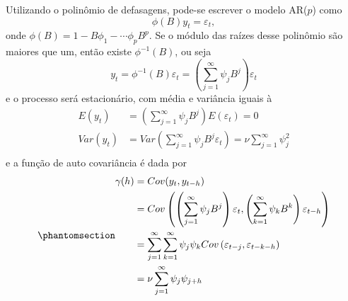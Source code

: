 \documentclass[
  letterpaper,
  DIV=11,
  numbers=noendperiod]{scrartcl}
\theoremstyle{definition}
\theoremstyle{definition}
\theoremstyle{plain}
\theoremstyle{plain}
\theoremstyle{remark}
\begin{document}
Utilizando o polinômio de defasagens, pode-se escrever o modelo
AR(\(p\)) como \begin{equation}
        \phi(B)y_t = \varepsilon_t,
\end{equation} onde \(\phi(B)=1-B\phi_1-\cdots \phi_p B^p\). Se o módulo
das raízes desse polinômio são maiores que um, então existe
\(\phi^{-1}(B)\), ou seja
\[y_t=\phi^{-1}(B)\varepsilon_t=\left(\sum_{j=1}^\infty \psi_jB^j\right)\varepsilon_t\]
e o processo será estacionário, com média e variância iguais à
\begin{align}E(y_t)&=\left(\sum_{j=1}^\infty \psi_jB^j\right)E(\varepsilon_t)=0\\
Var(y_t)&=Var\left(\sum_{j=1}^\infty \psi_jB^j\varepsilon_t\right)=\nu\sum_{j=1}^\infty \psi_j^2\\
\end{align} e a função de auto covariância é dada por
\begin{equation}\protect\phantomsection\label{eq-covariancia}{\begin{align}
\gamma(h)&=Cov(y_t,y_{t-h})\\&=Cov\left( \left(\sum_{j=1}^\infty \psi_jB^j\right)\varepsilon_t,\left(\sum_{k=1}^\infty \psi_kB^k\right)\varepsilon_{t-h}\right)\\
&=\sum_{j=1}^\infty \sum_{k=1}^\infty \psi_j\psi_k Cov\left(   \varepsilon_{t-j},\varepsilon_{t-k-h}\right)\\
&=\nu\sum_{j=1}^\infty \psi_j\psi_{j+h}\end{align}}\end{equation}
\end{document}
